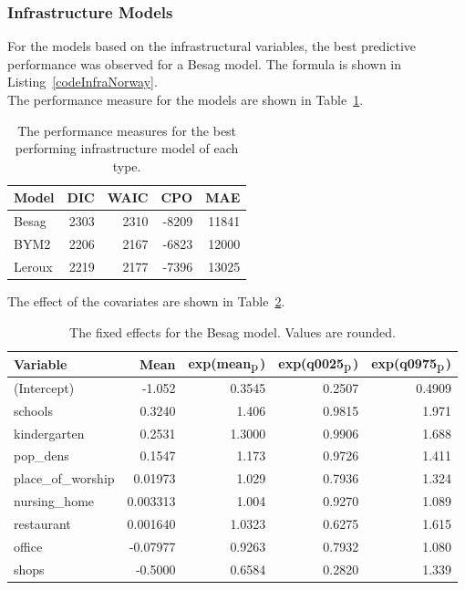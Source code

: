 \subsubsection{Infrastructure Models}
For the models based on the infrastructural variables, the best predictive performance was observed for a Besag model. The formula is shown in Listing~\ref{codeInfraNorway}. \\
The performance measure for the models are shown in Table~\ref{infraNorway}.
\begin{table}[H] 
\caption{The performance measures for the best performing infrastructure model of each type. \label{infraNorway}}
\begin{tabular}{l r r r r}
\toprule
\textbf{Model}	& \textbf{DIC}	& \textbf{WAIC} & \textbf{CPO} & \textbf{MAE} \\
\midrule
Besag  & 2303 & 2310 & -8209 & 11841 \\
BYM2 & 2206 & 2167 & -6823 & 12000\\
Leroux &  2219 & 2177 & -7396 & 13025\\
\bottomrule
\end{tabular}
\end{table}
The effect of the covariates are shown in Table~\ref{fixedInfraNorway}.
\begin{table}[H] 
\caption{The fixed effects for the Besag model. Values are rounded. \label{fixedInfraNorway}}
\begin{tabular}{l r r r r}
\toprule
\textbf{Variable}	& \textbf{Mean}	& \textbf{exp(mean$_{\hbox{p}}$)} & \textbf{exp(q0025$_{\hbox{p}}$)} & \textbf{exp(q0975$_{\hbox{p}}$)} \\
\midrule
(Intercept) & -1.052 & 0.3545 & 0.2507 & 0.4909 \\
schools & 0.3240 & 1.406 & 0.9815 & 1.971 \\
kindergarten & 0.2531 & 1.3000 & 0.9906 & 1.688 \\
pop\_dens & 0.1547 & 1.173 &  0.9726  & 1.411\\
place\_of\_worship & 0.01973 & 1.029 & 0.7936 & 1.324 \\
nursing\_home & 0.003313 & 1.004 & 0.9270 & 1.089\\
restaurant & 0.001640 & 1.0323 & 0.6275 & 1.615 \\
office & -0.07977 & 0.9263 &  0.7932 & 1.080 \\
shops & -0.5000 &0.6584 & 0.2820 & 1.339 \\
\bottomrule
\end{tabular}
\end{table}
